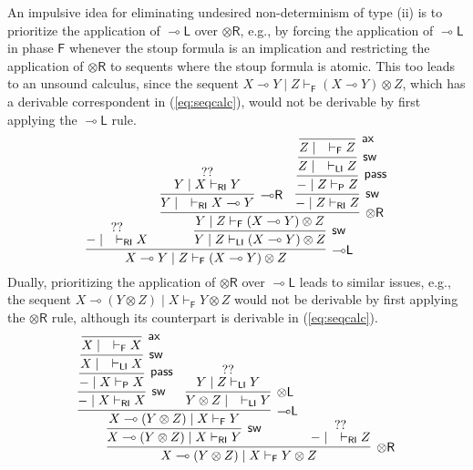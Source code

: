 \documentclass[copyright,creativecommons]{eptcs}
\theoremstyle{definition}
\newcommand{\tl}{\otimes \mathsf{L}}
\newcommand{\tr}{\otimes \mathsf{R}}
\newcommand{\lright}{{\multimap}\mathsf{R}}
\newcommand{\lleft}{{\multimap}\mathsf{L}}
\newcommand{\pass}{\mathsf{pass}}
\newcommand{\ax}{\mathsf{ax}}
\newcommand{\ot}{\otimes}
\newcommand{\lolli}{\multimap}
\newcommand{\RI}{\mathsf{RI}}
\newcommand{\LI}{\mathsf{LI}}
\newcommand{\Pass}{\mathsf{P}}
\newcommand{\F}{\mathsf{F}}
\newcommand{\SkNMILL}{$\mathtt{SkNMILL}$}
\begin{document}
An impulsive idea for eliminating undesired non-determinism of type (ii) is to prioritize the application of $\lleft$ over $\tr$, e.g., by forcing the application of $\lleft$ in phase $\F$ whenever the stoup formula is an implication and restricting the application of $\tr$ to sequents where the stoup formula is atomic. This too leads to an unsound calculus, since the sequent $X \lolli Y \mid Z \vdash_{\F} (X \lolli Y) \ot Z$, which has a derivable correspondent in (\ref{eq:seqcalc}), would not be derivable by first applying the $\lleft$ rule.
\begin{equation*}\label{eq:counterexample1}
   \infer[\lleft]{X \lolli Y \mid Z \vdash_{\F} (X \lolli Y) \ot Z}{
     \deduce{{-} \mid \quad \vdash_{\RI} X}{??}
     &
     \infer[\mathsf{sw}]{Y \mid Z \vdash_{\LI} (X \lolli Y) \ot Z}{
       \infer[\tr]{Y \mid Z \vdash_{\F} (X \lolli Y) \ot Z}{
         \infer[\lright]{Y \mid \quad \vdash_{\RI} X \lolli Y}{
           \deduce{Y \mid X \vdash_{\RI} Y}{??}
         }
         &
         \infer[\mathsf{sw}]{{-} \mid Z \vdash_{\RI} Z}{
           \infer[\pass]{{-} \mid Z \vdash_{\Pass} Z}{
             \infer[\mathsf{sw}]{Z \mid \quad \vdash_{\LI} Z}{
               \infer[\ax]{Z \mid \quad \vdash_{\F} Z}{}
             }
           }
         }
       }
     }
   }
\end{equation*}
Dually, prioritizing the application of $\tr$ over $\lleft$ leads to similar issues, e.g., the sequent $X \lolli (Y \ot Z) \mid X \vdash_\F Y \ot Z$ would not be derivable by first applying the $\tr$ rule, although its counterpart is derivable in  (\ref{eq:seqcalc}).
\begin{equation*}\label{eq:counterexample2}
\infer[\tr]{X \lolli (Y \ot Z) \mid X \vdash_{\F} Y \ot Z}{
  \infer[\mathsf{sw}]{X \lolli (Y \ot Z) \mid X \vdash_{\RI} Y}{
    \infer[\lleft]{X \lolli (Y \ot Z) \mid X \vdash_{\F} Y}{
      \infer[\mathsf{sw}]{{-}  \mid X \vdash_{\RI} X}{
        \infer[\pass]{{-}  \mid X \vdash_{\Pass} X}{
          \infer[\mathsf{sw}]{X \mid \quad \vdash_{\LI} X}{
            \infer[\ax]{X \mid \quad \vdash_{\F} X}{}
          }
        }
      }
      &
      \infer[\tl]{Y \ot Z \mid \quad \vdash_{\LI} Y}{
        \deduce{Y \mid Z \vdash_{\LI} Y}{??}
      }
    }
  }
  &
  \deduce{{-}  \mid \quad \vdash_{\RI} Z}{??}
}
\end{equation*}
%
\end{document}
